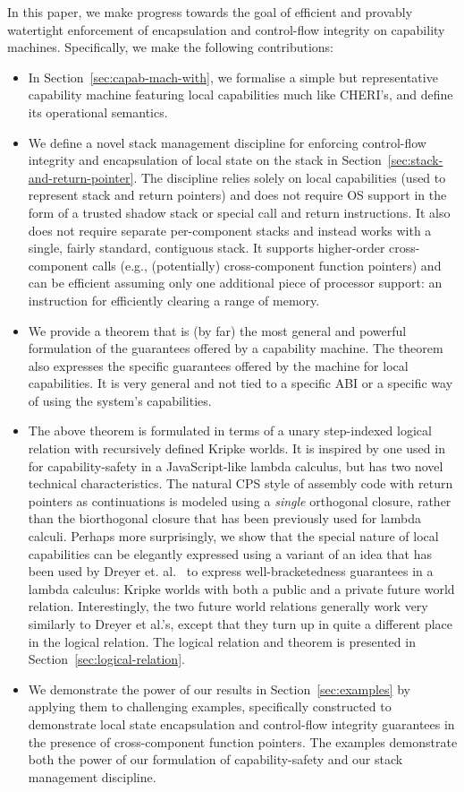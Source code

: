 \documentclass[compsoc,conference,letterpaper,fleqn]{IEEEtran}
\begin{document}
In this paper, we make progress towards the goal of efficient and provably
watertight enforcement of encapsulation and control-flow integrity on capability
machines.  Specifically, we make the following contributions:
\begin{itemize}
\item In Section~\ref{sec:capab-mach-with}, we formalise a simple but representative capability machine featuring
  local capabilities much like CHERI's, and define its operational semantics.
\item We define a novel stack management discipline for enforcing control-flow
  integrity and encapsulation of local state on the stack in Section~\ref{sec:stack-and-return-pointer}. The discipline relies
  solely on local capabilities (used to represent stack and return pointers) and
  does not require OS support in the form of a trusted shadow stack or special
  call and return instructions. It also does not require separate per-component
  stacks and instead works with a single, fairly standard, contiguous stack. It
  supports higher-order cross-component calls (e.g., (potentially)
  cross-component function pointers) and can be efficient assuming
  only
  one additional piece of processor support: an instruction for efficiently clearing
  a range of memory.
\item We provide a theorem that is (by far) the most general
  and powerful formulation of the guarantees offered by a capability machine.
  The theorem also expresses the specific guarantees offered by the machine for
  local capabilities. It is very general and not tied to a specific ABI or a
  specific way of using the system's capabilities.
\item The above theorem is formulated in terms of a unary step-indexed
  logical relation with recursively defined Kripke worlds. It is
  inspired by one used in \cite{Devriese:2016ObjCap} for
  capability-safety in a JavaScript-like lambda calculus, but has two
  novel technical characteristics. The natural CPS style of assembly
  code with return pointers as continuations is modeled using a
  \emph{single} orthogonal closure, rather than the biorthogonal
  closure that has been previously used for lambda calculi. Perhaps
  more surprisingly, we show that the special nature of local
  capabilities can be elegantly expressed using a variant of an idea
  that has been used by Dreyer et. al.~\cite{Dreyer:jfp12} to express
  well-bracketedness guarantees in a lambda calculus: Kripke worlds
  with both a public and a private future world relation. Interestingly,
  the two future world relations generally work very similarly to
  Dreyer et al.'s, except that they turn up in quite a different place
  in the logical relation. The logical relation and theorem is presented in Section~\ref{sec:logical-relation}.
\item We demonstrate the power of our results in Section~\ref{sec:examples} by applying them to challenging
  examples, specifically constructed to demonstrate local state encapsulation
  and control-flow integrity guarantees in the presence of cross-component
  function pointers. The examples demonstrate both the power of our formulation
  of capability-safety and our stack management discipline.
\end{itemize}
\end{document}
